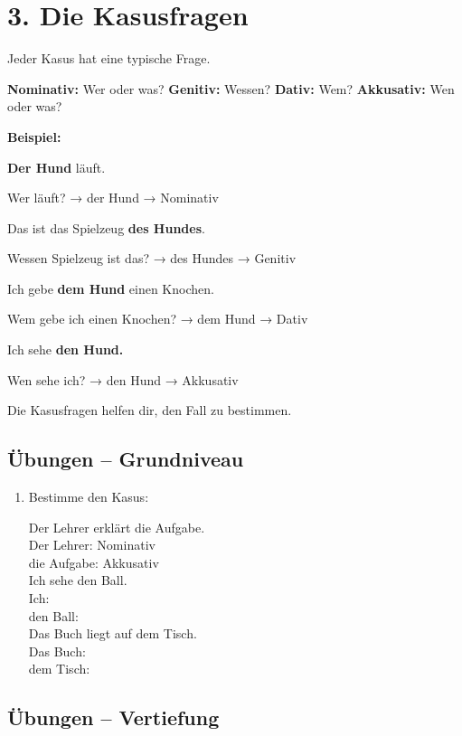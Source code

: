 \documentclass[a4paper,12pt]{article}
\begin{document}
\section*{3. Die Kasusfragen}

Jeder Kasus hat eine typische Frage.

\textbf{Nominativ:} Wer oder was?  
\textbf{Genitiv:} Wessen?  
\textbf{Dativ:} Wem?  
\textbf{Akkusativ:} Wen oder was?  

\textbf{Beispiel:}

\textbf{Der Hund} läuft.

Wer läuft? → der Hund → Nominativ

Das ist das Spielzeug \textbf{des Hundes}.

Wessen Spielzeug ist das? → des Hundes → Genitiv

Ich gebe \textbf{dem Hund} einen Knochen.

Wem gebe ich einen Knochen? → dem Hund → Dativ

Ich sehe \textbf{den Hund.}

Wen sehe ich? → den Hund → Akkusativ

\begin{merksatz}
Die Kasusfragen helfen dir, den Fall zu bestimmen.
\end{merksatz}

\subsection*{Übungen – Grundniveau}

\begin{enumerate}
\item Bestimme den Kasus:

Der Lehrer erklärt die Aufgabe.\\
Der Lehrer: Nominativ\\
die Aufgabe: Akkusativ\\

Ich sehe den Ball.\\
Ich:\\
den Ball:\\

Das Buch liegt auf dem Tisch.\\
Das Buch:\\
dem Tisch:

\end{enumerate}

\subsection*{Übungen – Vertiefung}
\end{document}
